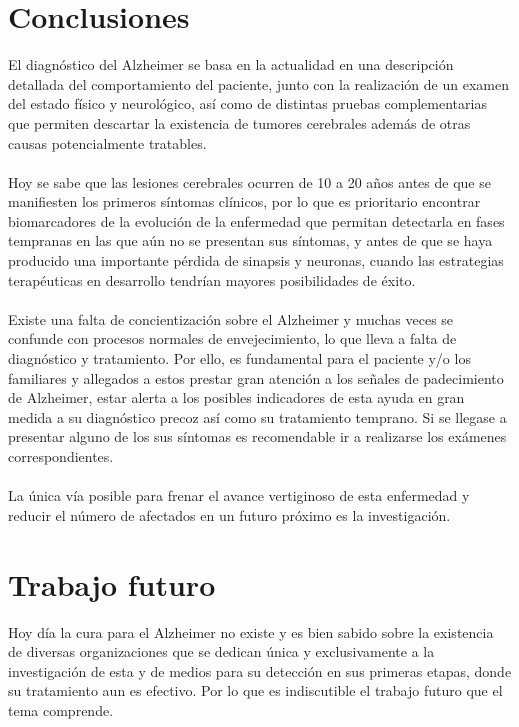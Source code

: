 \documentclass[smallextended, 12pt]{article}
\begin{document}
	\section{Conclusiones}
	El diagn\'ostico del Alzheimer se basa en la actualidad en una descripci\'on detallada del comportamiento del paciente, junto con la realizaci\'on de un examen del estado f\'isico y neurol\'ogico, as\'i como de distintas pruebas complementarias que permiten descartar la existencia de tumores cerebrales adem\'as de otras causas potencialmente tratables. \\
	\\
	Hoy se sabe que las lesiones cerebrales ocurren de 10 a 20 a\~nos antes de que se manifiesten los primeros s\'intomas cl\'inicos, por lo que es prioritario encontrar biomarcadores de la evoluci\'on de la enfermedad que permitan detectarla en fases tempranas en las que a\'un no se presentan sus s\'intomas, y antes de que se haya producido una importante p\'erdida de sinapsis y neuronas, cuando las estrategias terap\'euticas en desarrollo tendr\'ian mayores posibilidades de \'exito. \\
	\\
	Existe una falta de concientizaci\'on sobre el Alzheimer y muchas veces se confunde con procesos normales de envejecimiento, lo que lleva a falta de diagn\'ostico y tratamiento. Por ello, es fundamental para el paciente y/o los familiares y allegados a estos prestar gran atenci\'on a los se\~nales de padecimiento de Alzheimer, estar alerta a los posibles indicadores de esta ayuda en gran medida a su diagn\'ostico precoz as\'i como su tratamiento temprano. Si se llegase a presentar alguno de los sus s\'intomas es recomendable ir a realizarse los ex\'amenes correspondientes.\\
	\\
	La \'unica v\'ia posible para frenar el avance vertiginoso de esta enfermedad y reducir el n\'umero de afectados en un futuro pr\'oximo es la investigaci\'on.	
	
	\section{Trabajo futuro}
	Hoy d\'ia la cura para el Alzheimer no existe y es bien sabido sobre la existencia de diversas organizaciones que se dedican \'unica y exclusivamente a la investigaci\'on de esta y de medios para su detecci\'on en sus primeras etapas, donde su tratamiento aun es efectivo. Por lo que es indiscutible el trabajo futuro que el tema comprende.
	
\end{document}
